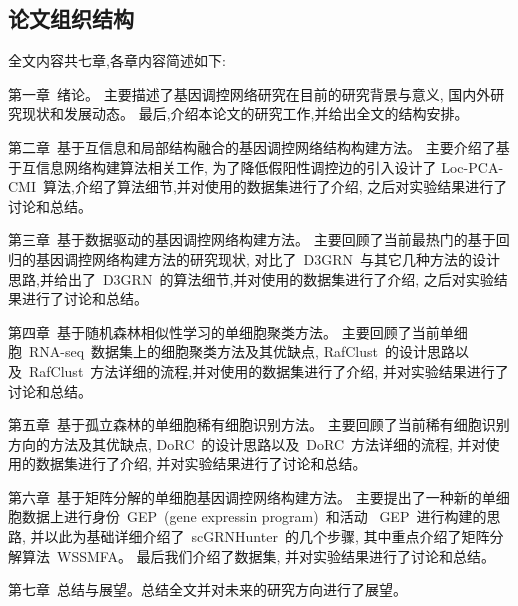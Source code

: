 \subsection{论文组织结构}

全文内容共七章,各章内容简述如下:

第一章~绪论。
主要描述了基因调控网络研究在目前的研究背景与意义, 国内外研究现状和发展动态。
最后,介绍本论文的研究工作,并给出全文的结构安排。

第二章~基于互信息和局部结构融合的基因调控网络结构构建方法。
主要介绍了基于互信息网络构建算法相关工作, 为了降低假阳性调控边的引入设计了
Loc-PCA-CMI~算法,介绍了算法细节,并对使用的数据集进行了介绍, 之后对实验结果进行了讨论和总结。

第三章~基于数据驱动的基因调控网络构建方法。
主要回顾了当前最热门的基于回归的基因调控网络构建方法的研究现状,
对比了~D3GRN~与其它几种方法的设计思路,并给出了~D3GRN~的算法细节,并对使用的数据集进行了介绍, 之后对实验结果进行了讨论和总结。

第四章~基于随机森林相似性学习的单细胞聚类方法。
主要回顾了当前单细胞~RNA-seq~数据集上的细胞聚类方法及其优缺点, 
RafClust~的设计思路以及~RafClust~方法详细的流程,并对使用的数据集进行了介绍, 并对实验结果进行了讨论和总结。

第五章~基于孤立森林的单细胞稀有细胞识别方法。
主要回顾了当前稀有细胞识别方向的方法及其优缺点, 
DoRC~的设计思路以及~DoRC~方法详细的流程, 并对使用的数据集进行了介绍, 并对实验结果进行了讨论和总结。

第六章~基于矩阵分解的单细胞基因调控网络构建方法。
主要提出了一种新的单细胞数据上进行身份~GEP~(gene expressin program)~和活动~
GEP~进行构建的思路, 并以此为基础详细介绍了~scGRNHunter~的几个步骤, 其中重点介绍了矩阵分解算法~WSSMFA。
最后我们介绍了数据集, 并对实验结果进行了讨论和总结。

第七章~总结与展望。总结全文并对未来的研究方向进行了展望。